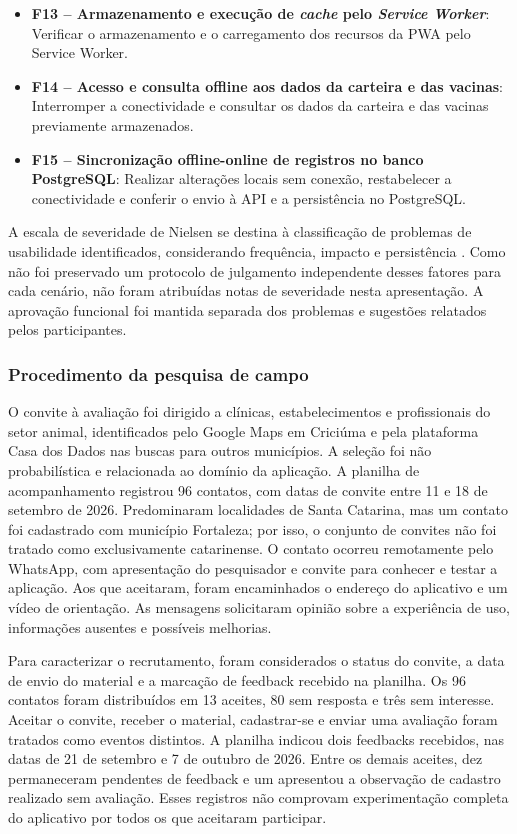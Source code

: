 \documentclass{UNESC}
\begin{document}
\begin{itemize}
    \item \textbf{F13 -- Armazenamento e execução de \textit{cache} pelo \textit{Service Worker}}: Verificar o armazenamento e o carregamento dos recursos da PWA pelo Service Worker.
    \item \textbf{F14 -- Acesso e consulta offline aos dados da carteira e das vacinas}: Interromper a conectividade e consultar os dados da carteira e das vacinas previamente armazenados.
    \item \textbf{F15 -- Sincronização offline-online de registros no banco PostgreSQL}: Realizar alterações locais sem conexão, restabelecer a conectividade e conferir o envio à API e a persistência no PostgreSQL.
\end{itemize}

A escala de severidade de Nielsen se destina à classificação de problemas de usabilidade identificados, considerando frequência, impacto e persistência \cite{nielsen1994}. Como não foi preservado um protocolo de julgamento independente desses fatores para cada cenário, não foram atribuídas notas de severidade nesta apresentação. A aprovação funcional foi mantida separada dos problemas e sugestões relatados pelos participantes.

\subsubsection{Procedimento da pesquisa de campo}

O convite à avaliação foi dirigido a clínicas, estabelecimentos e profissionais do setor animal, identificados pelo Google Maps em Criciúma e pela plataforma Casa dos Dados nas buscas para outros municípios. A seleção foi não probabilística e relacionada ao domínio da aplicação. A planilha de acompanhamento registrou 96 contatos, com datas de convite entre 11 e 18 de setembro de 2026. Predominaram localidades de Santa Catarina, mas um contato foi cadastrado com município Fortaleza; por isso, o conjunto de convites não foi tratado como exclusivamente catarinense. O contato ocorreu remotamente pelo WhatsApp, com apresentação do pesquisador e convite para conhecer e testar a aplicação. Aos que aceitaram, foram encaminhados o endereço do aplicativo e um vídeo de orientação. As mensagens solicitaram opinião sobre a experiência de uso, informações ausentes e possíveis melhorias.

Para caracterizar o recrutamento, foram considerados o status do convite, a data de envio do material e a marcação de feedback recebido na planilha. Os 96 contatos foram distribuídos em 13 aceites, 80 sem resposta e três sem interesse. Aceitar o convite, receber o material, cadastrar-se e enviar uma avaliação foram tratados como eventos distintos. A planilha indicou dois feedbacks recebidos, nas datas de 21 de setembro e 7 de outubro de 2026. Entre os demais aceites, dez permaneceram pendentes de feedback e um apresentou a observação de cadastro realizado sem avaliação. Esses registros não comprovam experimentação completa do aplicativo por todos os que aceitaram participar.
\end{document}
